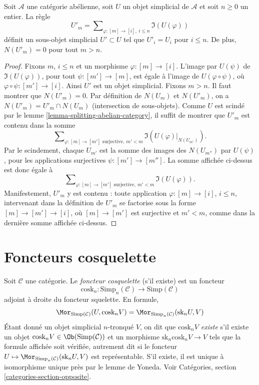 \begin{lemma}
\label{lemma-simplicial-abelian-n-skel-sub}
Soit $\mathcal{A}$ une catégorie abélienne, soit $U$ un objet simplicial
de $\mathcal{A}$ et soit $n \geq 0$ un entier. La règle
$$
U'_m = \sum\nolimits_{\varphi : [m] \to [i], \ i\leq n} \Im(U(\varphi))
$$
définit un sous-objet simplicial $U' \subset U$ tel que $U'_i = U_i$
pour $i \leq n$. De plus, $N(U'_m) = 0$ pour tout $m > n$.
\end{lemma}

\begin{proof}
Fixons $m$, $i \leq n$ et un morphisme $\varphi : [m] \to [i]$.
L'image par $U(\psi)$ de $\Im(U(\varphi))$, pour tout
$\psi : [m'] \to [m]$, est égale à l'image de
$U(\varphi \circ \psi)$, où
$\varphi \circ \psi : [m'] \to [i]$. Ainsi $U'$ est un objet
simplicial. Fixons $m > n$. Il faut montrer que $N(U'_m) = 0$.
Par définition de $N(U_m)$ et $N(U'_m)$, on a
$N(U'_m) = U'_m \cap N(U_m)$ (intersection de sous-objets).
Comme $U$ est scindé par le lemme
\ref{lemma-splitting-abelian-category}, il suffit de montrer que $U'_m$
est contenu dans la somme
$$
\sum\nolimits_{\varphi : [m] \to [m']\text{ surjective}, \ m' < m}
\Im(U(\varphi)|_{N(U_{m'})}).
$$
Par le scindement, chaque $U_{m'}$ est la somme des images des
$N(U_{m''})$ par $U(\psi)$, pour les applications surjectives
$\psi : [m'] \to [m'']$. La somme affichée ci-dessus est donc égale à
$$
\sum\nolimits_{\varphi : [m] \to [m']\text{ surjective}, \ m' < m}
\Im(U(\varphi)).
$$
Manifestement, $U'_m$ y est contenu : toute application
$\varphi : [m] \to [i]$, $i \leq n$, intervenant dans la définition de
$U'_m$ se factorise sous la forme $[m] \to [m'] \to [i]$, où
$[m] \to [m']$ est surjective et $m' < m$, comme dans la dernière somme
affichée ci-dessus.
\end{proof}




\section{Foncteurs cosquelette}
\label{section-coskeleton}

\noindent
Soit $\mathcal{C}$ une catégorie. Le {\it foncteur cosquelette}
(s'il existe) est un foncteur
$$
\text{cosk}_n :
\text{Simp}_n(\mathcal{C}) \longrightarrow \text{Simp}(\mathcal{C})
$$
adjoint à droite du foncteur squelette. En formule,
\begin{equation}
\label{equation-cosk}
\Mor_{\text{Simp}(\mathcal{C})}(U, \text{cosk}_n V)
=
\Mor_{\text{Simp}_n(\mathcal{C})}(\text{sk}_n U, V)
\end{equation}
Étant donné un objet simplicial $n$-tronqué $V$, on dit que
{\it $\text{cosk}_nV$ existe} s'il existe un objet
$\text{cosk}_nV \in \Ob(\text{Simp}(\mathcal{C}))$ et un morphisme
$\text{sk}_n \text{cosk}_n V \to V$ tels que la formule affichée soit
vérifiée, autrement dit si le foncteur
$U \mapsto \Mor_{\text{Simp}_n(\mathcal{C})}(\text{sk}_n U, V)$
est représentable. S'il existe, il est unique à isomorphisme unique près
par le lemme de Yoneda. Voir Catégories, section
\ref{categories-section-opposite}.

